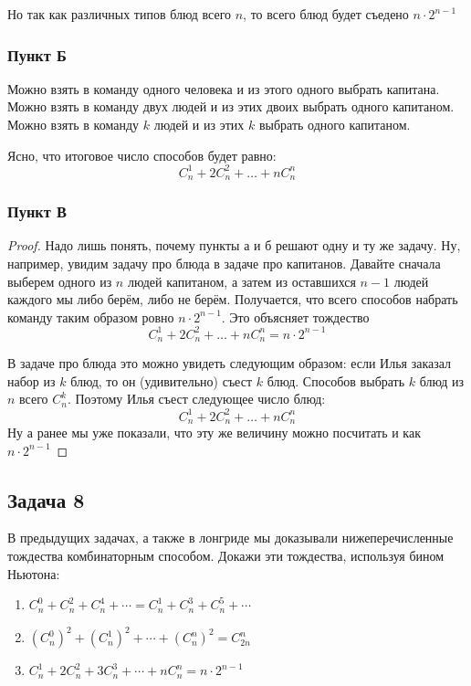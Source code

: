 Но так как различных типов блюд всего $n$, то всего блюд будет съедено $n \cdot 2^{n-1}$

\subsubsection{Пункт Б}
Можно взять в команду одного человека и из этого одного выбрать капитана. Можно взять в команду двух людей и из этих двоих выбрать одного капитаном. Можно взять в команду $k$ людей и из этих $k$ выбрать одного капитаном.

Ясно, что итоговое число способов будет равно:
\[
C^1_n + 2C^2_n + \ldots + nC^n_n
\]
\subsubsection{Пункт В}
\begin{proof}
Надо лишь понять, почему пункты а и б решают одну и ту же задачу. Ну, например, увидим задачу про блюда в задаче про капитанов. Давайте сначала выберем одного из $n$ людей капитаном, а затем из оставшихся $n -1$ людей каждого мы либо берём, либо не берём. Получается, что всего способов набрать команду таким образом ровно $n \cdot 2^{n-1}$. Это объясняет тождество 
\[
C^1_n + 2C^2_n + \ldots + nC^n_n = n \cdot 2^{n-1}
\]

В задаче про блюда это можно увидеть следующим образом: если Илья заказал набор из $k$ блюд, то он (удивительно) съест $k$ блюд. Способов выбрать $k$ блюд из $n$ всего $C^k_n$. Поэтому Илья съест следующее число блюд:
\[
C^1_n + 2C^2_n + \ldots + nC^n_n
\]
Ну а ранее мы уже показали, что эту же величину можно посчитать и как $n \cdot 2^{n-1}$
\end{proof}
 
\subsection{Задача 8}
В предыдущих задачах, а также в лонгриде мы доказывали нижеперечисленные тождества комбинаторным способом. Докажи эти тождества, используя бином Ньютона:

\begin{enumerate}[label=\asbuk*)]
\item $C_n^0 + C_n^2 + C_n^4 + \cdots = C_n^1 + C_n^3 + C_n^5 + \cdots$

\item $(C_n^0)^2 + (C_n^1)^2 + \cdots + (C_n^n)^2 = C_{2n}^n$

\item $C_n^1 + 2C_n^2 + 3C_n^3 + \cdots + nC_n^n = n \cdot 2^{n-1}$
\end{enumerate}

